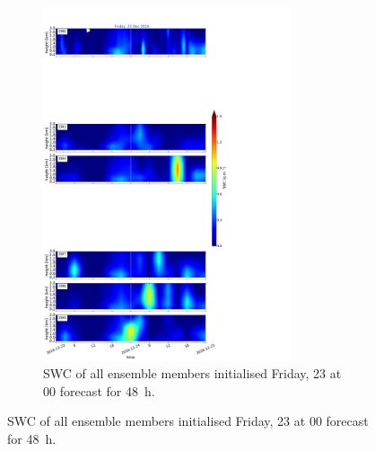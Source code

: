 \begin{figure}[h]%
	\centering
	\begin{subfigure}[t]{\textwidth} 
		\centering
		\includegraphics[trim={0cm 0cm 18.3cm 5.1cm},clip,width=0.8\textwidth]{./fig_09EM/20161223}
		\caption{SWC of all ensemble members initialised Friday, \SI{23}{\dec} at 0\SI{0}{\UTC} forecast for \SI{48}{\hour}.}\label{fig:EM09_23}
	\end{subfigure}
\end{figure}
